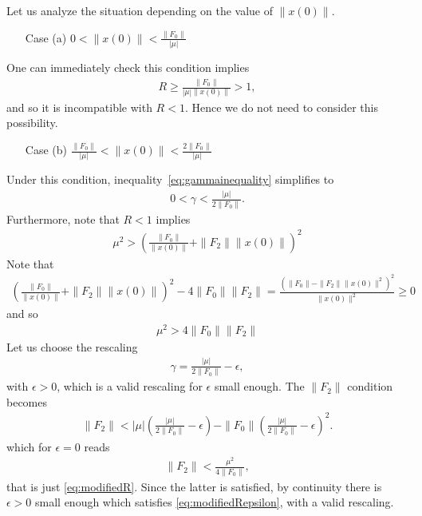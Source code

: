 \documentclass[superscriptaddress,onecolumn,nofootinbib,longbibliography,a4paper,accepted=2026-09-29]{quantumarticle}
\theoremstyle{plain}
\theoremstyle{definition}
\numberwithin{thm}{section}
\numberwithin{assumption}{section}
\numberwithin{lemma}{section}
\numberwithin{prop}{section}
\numberwithin{cor}{section}
\numberwithin{definition}{section}
\numberwithin{rmk}{section}
\numberwithin{equation}{section}
\begin{document}
Let us analyze the situation depending on the value of $\| x(0)\|$.
\begin{itemize}
    \item[Case (a)] $0 < \| x(0)\| < \frac{\| F_0\|}{|\mu|}$
\end{itemize}
One can immediately check this condition implies
\begin{align}
    R \geq  \frac{\| F_0\|}{|\mu| \| x(0)\|}>1,
\end{align}
and so it is incompatible with $R<1$. Hence we do not need to consider this possibility.
\begin{itemize}
    \item[Case (b)] $\frac{\| F_0\|}{|\mu|} < \| x(0)\| < \frac{2 \| F_0\|}{|\mu|}$
\end{itemize}
Under this condition, inequality~\eqref{eq:gammainequality} simplifies to
\begin{align}
\label{eq:gammainequalitysimpler}
    0 < \gamma < \frac{|\mu| }{2\| F_0\|}.
\end{align}
Furthermore, note that $R<1$ implies
\begin{align}
    \mu^2 > \left( \frac{\|F_0\|}{\| x(0)\|} + \| F_2\| \| x(0)\|\right)^2
\end{align}
Note that
\begin{align}
    \left( \frac{\|F_0\|}{\| x(0)\|} + \| F_2\| \| x(0)\|\right)^2 - 4 \| F_0\| \| F_2\| = \frac{(\| F_0\| - \| F_2\| \| x(0)\|^2)^2}{\| x(0)\|^2}\geq 0 
\end{align}
and so
\begin{align}
\label{eq:modifiedR}
  \mu^2 > 4 \| F_0\| \|F_2\| 
\end{align}
Let us choose the rescaling 
\begin{align}
    \gamma = \frac{|\mu|}{2\| F_0\|} - \epsilon,
\end{align} 
with $\epsilon>0$, which is a valid rescaling for $\epsilon$ small enough. The $\|F_2\|$ condition becomes
\begin{align}
\label{eq:modifiedRepsilon}
       \| F_2\| < | \mu| \left(\frac{|\mu|}{2\| F_0\|} - \epsilon\right) -  \| F_0\| \left(\frac{|\mu|}{2\| F_0\|} - \epsilon\right)^2. 
\end{align}
which for $\epsilon = 0$ reads
\begin{align}
    \| F_2\| < \frac{\mu^2}{4 \| F_0\|},
\end{align}
that is just \eqref{eq:modifiedR}. Since the latter is satisfied, by continuity there is $\epsilon>0$ small enough which satisfies \eqref{eq:modifiedRepsilon}, with a valid rescaling.
\end{document}
